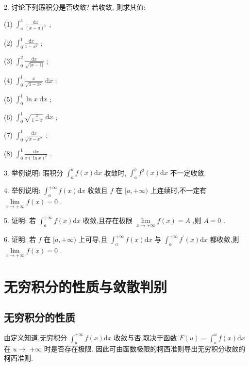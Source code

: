 2. 讨论下列瑕积分是否收敛? 若收敛, 则求其值:

(1) \({\int }_{a}^{b}\frac{\mathrm{d}x}{{\left( x - a\right) }^{p}}\) ;

(2) \({\int }_{0}^{1}\frac{\mathrm{d}x}{1 - {x}^{2}}\) ;

(3) \({\int }_{0}^{2}\frac{\mathrm{d}x}{\sqrt{\left| x - 1\right| }}\) ;

(4) \({\int }_{0}^{1}\frac{x}{\sqrt{1 - {x}^{2}}}\mathrm{\;d}x\) ;

(5) \({\int }_{0}^{1}\ln x\mathrm{\;d}x\) ;

(6) \({\int }_{0}^{1}\sqrt{\frac{x}{1 - x}}\mathrm{\;d}x\) ;

(7) \({\int }_{0}^{1}\frac{\mathrm{d}x}{\sqrt{x - {x}^{2}}}\) ;

(8) \({\int }_{0}^{1}\frac{\mathrm{d}x}{x{\left( \ln x\right) }^{p}}\) .

3. 举例说明: 瑕积分 \({\int }_{a}^{b}f\left( x\right) \mathrm{d}x\) 收敛时, \({\int }_{a}^{b}{f}^{2}\left( x\right) \mathrm{d}x\) 不一定收敛.

4. 举例说明: \({\int }_{a}^{+\infty }f\left( x\right) \mathrm{d}x\) 收敛且 \(f\) 在 \(\lbrack a, + \infty )\) 上连续时,不一定有 \(\mathop{\lim }\limits_{{x \rightarrow   + \infty }}f\left( x\right)  = 0\) .

5. 证明: 若 \({\int }_{a}^{+\infty }f\left( x\right) \mathrm{d}x\) 收敛,且存在极限 \(\mathop{\lim }\limits_{{x \rightarrow   + \infty }}f\left( x\right)  = A\) ,则 \(A = 0\) .

6. 证明: 若 \(f\) 在 \(\lbrack a, + \infty )\) 上可导,且 \({\int }_{a}^{+\infty }f\left( x\right) \mathrm{d}x\) 与 \({\int }_{a}^{+\infty }{f}^{\prime }\left( x\right) \mathrm{d}x\) 都收敛,则 \(\mathop{\lim }\limits_{{x \rightarrow   + \infty }}f\left( x\right)  = 0\) .

\section{无穷积分的性质与敛散判别}

\subsection{无穷积分的性质}

由定义知道,无穷积分 \({\int }_{a}^{+\infty }f\left( x\right) \mathrm{d}x\) 收敛与否,取决于函数 \(F\left( u\right)  = {\int }_{a}^{u}f\left( x\right) \mathrm{d}x\) 在 \(u \rightarrow\)  \(+ \infty\) 时是否存在极限. 因此可由函数极限的柯西准则导出无穷积分收敛的柯西准则.

